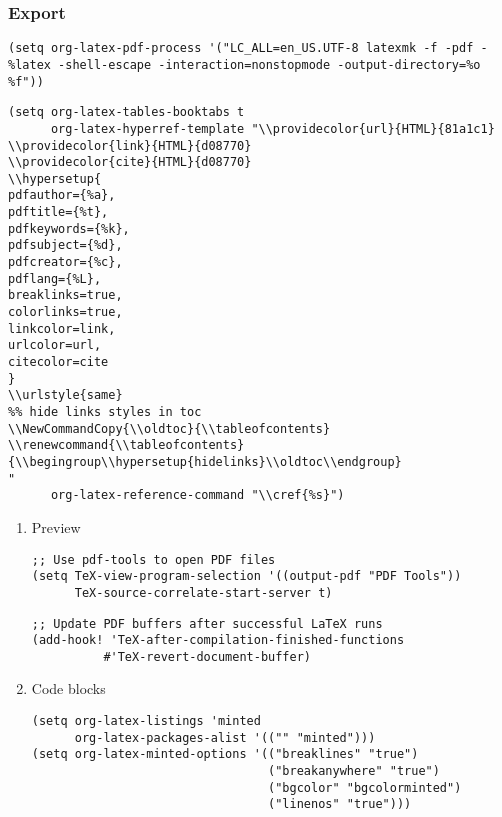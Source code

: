 \documentclass[c]{article}
\theoremstyle{plain}%
\theoremstyle{definition}
\theoremstyle{remark}
\renewcommand{\tableofcontents}{\begingroup\hypersetup{hidelinks}\oldtoc\endgroup}
\begin{document}
\subsubsection{Export}
\label{sec:org6b5b98a}
\begin{verbatim}
(setq org-latex-pdf-process '("LC_ALL=en_US.UTF-8 latexmk -f -pdf -%latex -shell-escape -interaction=nonstopmode -output-directory=%o %f"))
\end{verbatim}
\begin{verbatim}
(setq org-latex-tables-booktabs t
      org-latex-hyperref-template "\\providecolor{url}{HTML}{81a1c1}
\\providecolor{link}{HTML}{d08770}
\\providecolor{cite}{HTML}{d08770}
\\hypersetup{
pdfauthor={%a},
pdftitle={%t},
pdfkeywords={%k},
pdfsubject={%d},
pdfcreator={%c},
pdflang={%L},
breaklinks=true,
colorlinks=true,
linkcolor=link,
urlcolor=url,
citecolor=cite
}
\\urlstyle{same}
%% hide links styles in toc
\\NewCommandCopy{\\oldtoc}{\\tableofcontents}
\\renewcommand{\\tableofcontents}{\\begingroup\\hypersetup{hidelinks}\\oldtoc\\endgroup}
"
      org-latex-reference-command "\\cref{%s}")
\end{verbatim}
\begin{enumerate}
\item Preview
\label{sec:org13c4e01}
\begin{verbatim}
;; Use pdf-tools to open PDF files
(setq TeX-view-program-selection '((output-pdf "PDF Tools"))
      TeX-source-correlate-start-server t)
\end{verbatim}
\begin{verbatim}
;; Update PDF buffers after successful LaTeX runs
(add-hook! 'TeX-after-compilation-finished-functions
          #'TeX-revert-document-buffer)
\end{verbatim}
\item Code blocks
\label{sec:orgdc255b3}
\begin{verbatim}
(setq org-latex-listings 'minted
      org-latex-packages-alist '(("" "minted")))
(setq org-latex-minted-options '(("breaklines" "true")
                                 ("breakanywhere" "true")
                                 ("bgcolor" "bgcolorminted")
                                 ("linenos" "true")))
\end{verbatim}
\end{enumerate}
\end{document}
